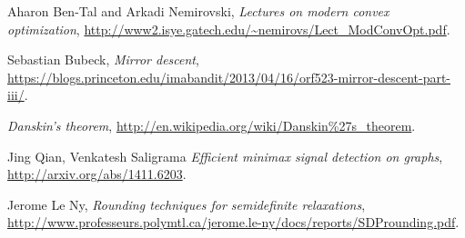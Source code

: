 \documentclass{article}
\begin{document}
\begin{comment}
% 

\end{comment}



\begin{thebibliography}{9}

  Aharon Ben-Tal and Arkadi Nemirovski,
  \emph{Lectures on modern convex optimization},
  \url{http://www2.isye.gatech.edu/~nemirovs/Lect_ModConvOpt.pdf}.

  Sebastian Bubeck,
  \emph{Mirror descent},
  \url{https://blogs.princeton.edu/imabandit/2013/04/16/orf523-mirror-descent-part-iii/}.

  \emph{Danskin's theorem},
  \url{http://en.wikipedia.org/wiki/Danskin\%27s_theorem}.

  Jing Qian, Venkatesh Saligrama
  \emph{Efficient minimax signal detection on graphs},
  \url{http://arxiv.org/abs/1411.6203}.

  Jerome Le Ny,
  \emph{Rounding techniques for semidefinite relaxations},
  \url{http://www.professeurs.polymtl.ca/jerome.le-ny/docs/reports/SDProunding.pdf}.
\end{thebibliography}
\end{document}
